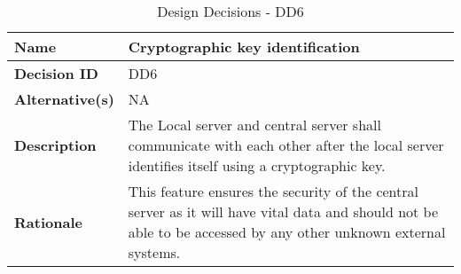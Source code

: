\begin{table}[H]
	\centering
	\begin{tabularx}{\linewidth}{l|X}
		\textbf{Name}      & Cryptographic key identification \\ \hline
		\textbf{Decision ID}  & DD6 \\ \hline
		\textbf{Alternative(s)}     &  NA \\ \hline
		\textbf{Description}   & The Local server and central server shall communicate with each other after the local server identifies itself using a cryptographic key.\\ \hline
		\textbf{Rationale}    & This feature ensures the security of the central server as it will have vital data and should not be able to be accessed by any other unknown external systems. \\ \hline
	\end{tabularx}
	\caption{Design Decisions - DD6}
	\label{tbl:uc1}
\end{table}